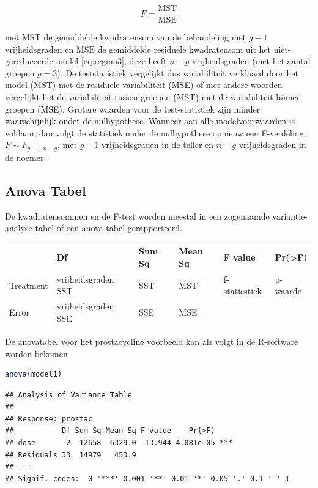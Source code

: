 \documentclass[
  12pt,dutch,coursenotes]{book}
\theoremstyle{definition}
\theoremstyle{definition}
\theoremstyle{definition}
\theoremstyle{definition}
\theoremstyle{remark}
\begin{document}
\[F = \frac{\text{MST}}{\text{MSE}}\]

met \(\text{MST}\) de gemiddelde kwadratensom van de behandeling met \(g-1\) vrijheidsgraden en \(\text{MSE}\) de gemiddelde residuele kwadratensom uit het niet-gereduceerde model \eqref{eq:regmu3}, deze heeft \(n-g\) vrijheidsgraden (met het aantal groepen \(g=3\)).
De teststatistiek vergelijkt dus variabiliteit verklaard door het model (MST) met de residuele variabiliteit (MSE) of met andere woorden vergelijkt het de
variabiliteit tussen groepen (MST) met de variabiliteit binnen groepen (MSE).
Grotere waarden voor de test-statistiek zijn minder waarschijnlijk onder de nulhypothese.
Wanneer aan alle modelvoorwaarden is voldaan, dan volgt de statistiek onder de nulhypothese opnieuw een F-verdeling, \(F \sim F_{g-1,n-g}\), met \(g-1\) vrijheidsgraden in de teller en \(n-g\) vrijheidsgraden in de noemer.

\hypertarget{anova-tabel-1}{%
\subsection{Anova Tabel}\label{anova-tabel-1}}

De kwadratensommen en de F-test worden meestal in een zogenaamde variantie-analyse tabel of een anova tabel gerapporteerd.

\begin{tabular}{l|l|l|l|l|l}
\hline
  & Df & Sum Sq & Mean Sq & F value & Pr(>F)\\
\hline
Treatment & vrijheidsgraden SST & SST & MST & f-statiestiek & p-waarde\\
\hline
Error & vrijheidsgraden SSE & SSE & MSE &  & \\
\hline
\end{tabular}

De anovatabel voor het prostacycline voorbeeld kan als volgt in de R-software worden bekomen

\begin{lstlisting}[language=R]
anova(model1)
\end{lstlisting}

\begin{lstlisting}
## Analysis of Variance Table
## 
## Response: prostac
##           Df Sum Sq Mean Sq F value    Pr(>F)    
## dose       2  12658  6329.0  13.944 4.081e-05 ***
## Residuals 33  14979   453.9                      
## ---
## Signif. codes:  0 '***' 0.001 '**' 0.01 '*' 0.05 '.' 0.1 ' ' 1
\end{lstlisting}
\end{document}
